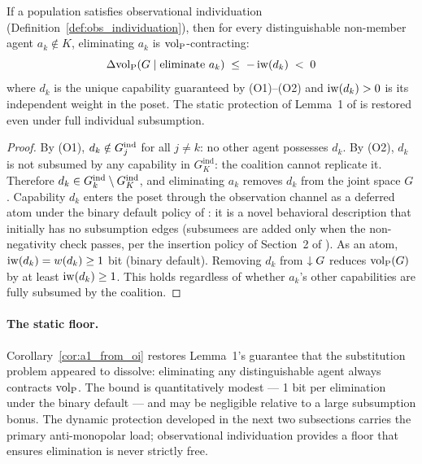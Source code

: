 \begin{corollary}
\label{cor:a1_from_oi}
If a population satisfies observational individuation
    (Definition~\ref{def:obs_individuation}), then for every distinguishable
    non-member agent $a_k \notin K$, eliminating $a_k$ is
    ${\operatorname{vol}_{\mathrm{P}}}$-contracting:
\begin{equation}
\label{eq:oi_contraction}
\Delta {\operatorname{vol}_{\mathrm{P}}}(G \mid \text{eliminate } a_k) \;\leq\; -\operatorname{iw}(d_k) \;<\; 0
\end{equation}
    where $d_k$ is the unique capability guaranteed by (O1)--(O2) and
    $\operatorname{iw}(d_k) > 0$ is its independent weight in the poset. The static
    protection of Lemma~1 of \citet{lasser2026gfm} is restored even under
    full individual subsumption.
\end{corollary}

\begin{proof}
By (O1), $d_k \notin G_{j}^{\mathrm{ind}}$ for all $j \neq k$: no other agent
possesses $d_k$. By (O2), $d_k$ is not subsumed by any capability in
$G_K^{\mathrm{ind}}$: the coalition cannot replicate it. Therefore
$d_k \in G_{k}^{\mathrm{ind}} \setminus G_K^{\mathrm{ind}}$, and eliminating $a_k$
removes $d_k$ from the joint space $G$. Capability $d_k$ enters the poset through the observation channel as a
deferred atom under the binary default policy of
\citet{lasser2026poset}: it is a novel behavioral description that
initially has no subsumption edges (subsumees are added only when the
non-negativity check passes, per the insertion policy of Section~2 of
\citet{lasser2026poset}). As an atom, $\operatorname{iw}(d_k) = w(d_k) \geq 1$ bit
(binary default). Removing $d_k$ from $\downarrow G$ reduces
${\operatorname{vol}_{\mathrm{P}}}(G)$ by at least $\operatorname{iw}(d_k) \geq 1$. This holds regardless of whether $a_k$'s other
capabilities are fully subsumed by the coalition.
\end{proof}

\paragraph{The static floor.}
Corollary~\ref{cor:a1_from_oi} restores Lemma~1's guarantee that the
substitution problem appeared to dissolve: eliminating any distinguishable
agent always contracts ${\operatorname{vol}_{\mathrm{P}}}$. The bound is quantitatively modest --- 1 bit
per elimination under the binary default --- and may be negligible relative
to a large subsumption bonus. The dynamic protection developed in the next
two subsections carries the primary anti-monopolar load; observational
individuation provides a floor that ensures elimination is never strictly
free.

